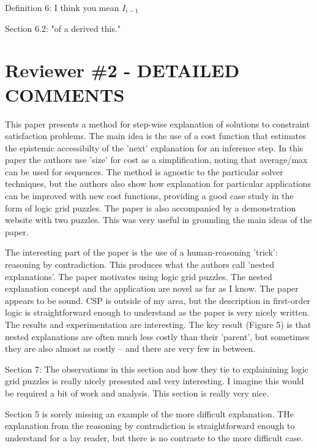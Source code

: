 \documentclass{article}
\begin{document}
Definition 6: I think you mean $I_{i-1}
$

Section 6.2: "of a derived this."



\section*{Reviewer \#2 - DETAILED COMMENTS}

This paper presents a method for step-wise explanation of solutions to
constraint satisfaction problems. The main idea is the use of a cost
function that estimates the epistemic accessibilty of the 'next'
explanation for an inference step. In this paper the authors use 'size'
for cost as a simplification, noting that average/max can be used for
sequences.  The method is agnostic to the particular solver techniques,
but the authors also show how explanation for particular applications
can be improved with new cost functions, providing a good case study in
the form of logic grid puzzles. The paper is also accompanied by a
demonstration website with two puzzles. This was very useful in
grounding the main ideas of the paper.

The interesting part of the paper is the use of a human-reasoning
'trick': reasoning by contradiction. This produces what the authors
call 'nested explanations'. The paper motivates using logic grid
puzzles. The nested explanation concept and the application are novel
as far as I know. The paper appears to be sound. CSP is outside of my
area, but the description in first-order logic is straightforward
enough to understand as the paper is very nicely written. The results
and experimentation are interesting. The key result (Figure 5) is that
nested explanations are often much less costly than their 'parent', but
sometimes they are also almost as costly -- and there are very few in
between.


Section 7: The observations in this section and how they tie to
explainining logic grid puzzles is really nicely presented and very
interesting. I imagine this would be required a bit of work and
analysis. This section is really very nice.


\begin{quoteit}
Section 5 is sorely missing an example of the more difficult explanation. THe explanation from the reasoning by contradiction is straightforward enough to understand for a lay reader, but there is no contraste to the more difficult case.
\end{quoteit}
\end{document}

